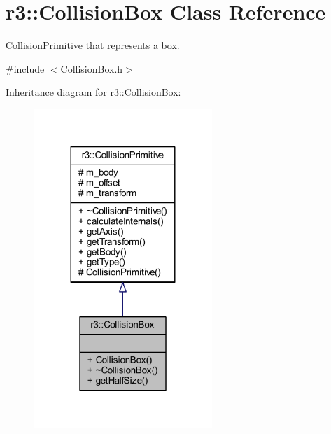 \hypertarget{classr3_1_1_collision_box}{}\section{r3\+:\+:Collision\+Box Class Reference}
\label{classr3_1_1_collision_box}


\mbox{\hyperlink{classr3_1_1_collision_primitive}{Collision\+Primitive}} that represents a box.  




{\ttfamily \#include $<$Collision\+Box.\+h$>$}



Inheritance diagram for r3\+:\+:Collision\+Box\+:\nopagebreak
\begin{figure}[H]
\begin{center}
\leavevmode
\includegraphics[width=191pt]{classr3_1_1_collision_box__inherit__graph}
\end{center}
\end{figure}


